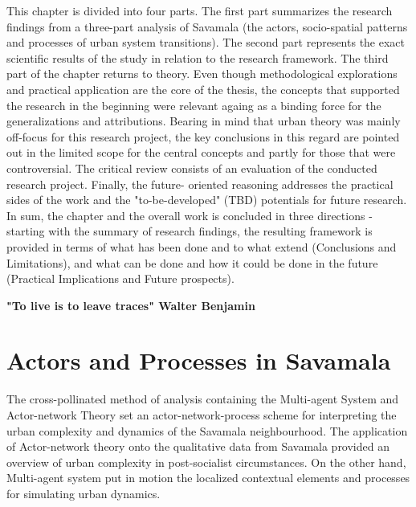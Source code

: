 \documentclass[11pt]{report}
\begin{document}
{{{This chapter is divided into four parts. The first part summarizes the research findings from a three-part analysis of Savamala (the actors, socio-spatial patterns and processes of urban system transitions). The second part represents the exact scientific results of the study in relation to the research framework. The third part of the chapter returns to theory. Even though methodological explorations and practical application are the core of the thesis, the concepts that supported the research in the beginning were relevant againg as a binding force for the generalizations and attributions. Bearing in mind that urban theory was mainly off-focus for this research project, the key conclusions in this regard are pointed out in the limited scope for the central concepts and partly for those that were controversial. The critical review consists of an evaluation of the conducted research project. Finally, the future- oriented reasoning addresses the practical sides of the work and the "to-be-developed" (TBD) potentials for future research.
\\

In sum, the chapter and the overall work is concluded in three directions - starting with the summary of research findings, the resulting framework is provided 
in terms of what has been done and to what extend (Conclusions and Limitations), and what can be done and how it could be done in the future (Practical Implications and Future prospects).

\textbf{"To live is to leave traces" Walter Benjamin}

\section{Actors and Processes in Savamala}

The cross-pollinated method of analysis containing the Multi-agent System and Actor-network Theory set an actor-network-process scheme for interpreting the urban complexity and dynamics of the Savamala neighbourhood. The application of Actor-network theory onto the qualitative data from Savamala provided an overview of urban complexity in post-socialist circumstances. On the other hand, Multi-agent system put in motion the localized contextual elements and processes for simulating urban dynamics.
\\

}}}
\end{document}
